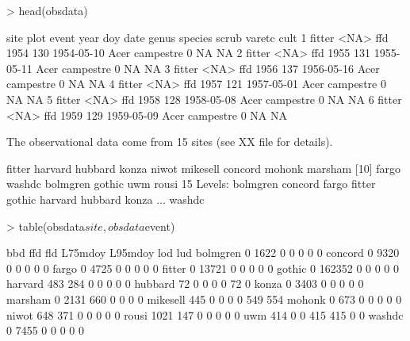 \documentclass{article}
\begin{document}
\begin{Schunk}
\begin{Sinput}
> head(obsdata)
\end{Sinput}
\begin{Soutput}
    site plot event year doy       date genus   species scrub varetc cult
1 fitter <NA>   ffd 1954 130 1954-05-10  Acer campestre     0     NA   NA
2 fitter <NA>   ffd 1955 131 1955-05-11  Acer campestre     0     NA   NA
3 fitter <NA>   ffd 1956 137 1956-05-16  Acer campestre     0     NA   NA
4 fitter <NA>   ffd 1957 121 1957-05-01  Acer campestre     0     NA   NA
5 fitter <NA>   ffd 1958 128 1958-05-08  Acer campestre     0     NA   NA
6 fitter <NA>   ffd 1959 129 1959-05-09  Acer campestre     0     NA   NA
\end{Soutput}
\end{Schunk}

The observational data come from 15 sites (see XX file for details).

\begin{Schunk}
\begin{Soutput}
 [1] fitter   harvard  hubbard  konza    niwot    mikesell concord  mohonk   marsham 
[10] fargo    washdc   bolmgren gothic   uwm      rousi   
15 Levels: bolmgren concord fargo fitter gothic harvard hubbard konza ... washdc
\end{Soutput}
\end{Schunk}

\begin{Schunk}
\begin{Sinput}
> table(obsdata$site, obsdata$event)
\end{Sinput}
\begin{Soutput}
              bbd    ffd    fld L75mdoy L95mdoy    lod    lud
  bolmgren      0   1622      0       0       0      0      0
  concord       0   9320      0       0       0      0      0
  fargo         0   4725      0       0       0      0      0
  fitter        0  13721      0       0       0      0      0
  gothic        0 162352      0       0       0      0      0
  harvard     483    284      0       0       0      0      0
  hubbard      72      0      0       0       0     72      0
  konza         0   3403      0       0       0      0      0
  marsham       0   2131    660       0       0      0      0
  mikesell    445      0      0       0       0    549    554
  mohonk        0    673      0       0       0      0      0
  niwot       648    371      0       0       0      0      0
  rousi      1021    147      0       0       0      0      0
  uwm         414      0      0     415     415      0      0
  washdc        0   7455      0       0       0      0      0
\end{Soutput}
\end{Schunk}
\end{document}
